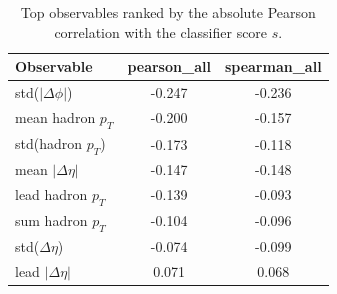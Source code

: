 \begin{table}
\caption{Top observables ranked by the absolute Pearson correlation with the classifier score $s$.}
\label{tab:corr_top}
\begin{tabular}{lcc}
\toprule
Observable & pearson_all & spearman_all \\
\midrule
std($|\Delta\phi|$) & -0.247 & -0.236 \\
mean hadron $p_T$ & -0.200 & -0.157 \\
std(hadron $p_T$) & -0.173 & -0.118 \\
mean $|\Delta\eta|$ & -0.147 & -0.148 \\
lead hadron $p_T$ & -0.139 & -0.093 \\
sum hadron $p_T$ & -0.104 & -0.096 \\
std($\Delta\eta$) & -0.074 & -0.099 \\
lead $|\Delta\eta|$ & 0.071 & 0.068 \\
\bottomrule
\end{tabular}
\end{table}
